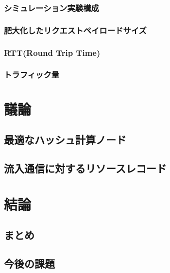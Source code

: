 \documentclass[12pt]{jarticle} %
\begin{document}
\subsubsection{シミュレーション実験構成}
\subsubsection{肥大化したリクエストペイロードサイズ}
\subsubsection{RTT(Round Trip Time)}
\subsubsection{トラフィック量}

\newpage
\section{議論}
\subsection{最適なハッシュ計算ノード}
\subsection{流入通信に対するリソースレコード}

\newpage
\section{結論}
\subsection{まとめ}
\subsection{今後の課題}
\end{document}
